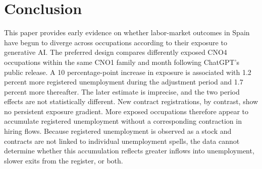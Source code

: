 %



\section{Conclusion}
\label{sec:conclusion}

This paper provides early evidence on whether labor-market outcomes in Spain have begun to diverge across occupations according to their exposure to generative AI. The preferred design compares differently exposed CNO4 occupations within the same CNO1 family and month following ChatGPT's public release. A 10 percentage-point increase in exposure is associated with 1.2 percent more registered unemployment during the adjustment period and 1.7 percent more thereafter. The later estimate is imprecise, and the two period effects are not statistically different. New contract registrations, by contrast, show no persistent exposure gradient. More exposed occupations therefore appear to accumulate registered unemployment without a corresponding contraction in hiring flows. Because registered unemployment is observed as a stock and contracts are not linked to individual unemployment spells, the data cannot determine whether this accumulation reflects greater inflows into unemployment, slower exits from the register, or both.

